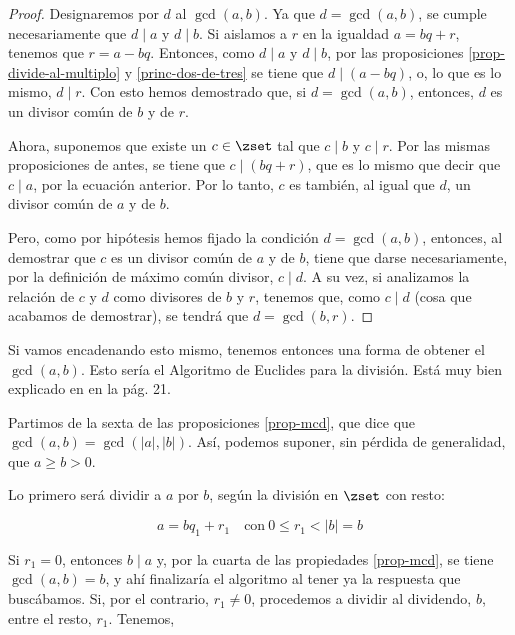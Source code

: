 \begin{proof}
  Designaremos por $d$ al $\gcd(a, b)$. Ya que $d = \gcd(a, b)$, se cumple
  necesariamente que $d \mid a$ y $d \mid b$. Si aislamos a $r$ en la
  igualdad $a = bq + r$, tenemos que $r = a - bq$. Entonces, como $d \mid a$
  y $d \mid b$, por las proposiciones \ref{prop-divide-al-multiplo} y
  \ref{princ-dos-de-tres} se tiene que $d \mid (a - bq)$, o, lo que es lo
  mismo, $d \mid r$. Con esto hemos demostrado que, si $d = \gcd(a, b)$,
  entonces, $d$ es un divisor común de $b$ y de $r$.

  Ahora, suponemos que existe un $c \in \zset$ tal que $c \mid b$ y $c \mid
  r$. Por las mismas proposiciones de antes, se tiene que $c \mid (bq + r)$,
  que es lo mismo que decir que $c \mid a$, por la ecuación anterior. Por lo
  tanto, $c$ es también, al igual que $d$, un divisor común de $a$ y de $b$.

  Pero, como por hipótesis hemos fijado la condición $d = \gcd(a, b)$,
  entonces, al demostrar que $c$ es un divisor común de $a$ y de $b$, tiene
  que darse necesariamente, por la definición de máximo común divisor, $c
  \mid d$. A su vez, si analizamos la relación de $c$ y $d$ como divisores
  de $b$ y $r$, tenemos que, como $c \mid d$ (cosa que acabamos de
  demostrar), se tendrá que $d = \gcd(b, r)$.
\end{proof}

\iffalse
Esta demostración está sacada de \cite{burton}, en la sección
2.4 \engm{The Euclidean Algorithm}, página 27. Aquí
\url{https://www.youtube.com/watch?v=rxL6nhYgI3E} hay otra demostración,
pero tiene un fallo y no sé si fiarme. Además, usa un teorema que no sé
demostrar. TKTK.
\fi

Si vamos encadenando esto mismo, tenemos entonces una forma de obtener el
$\gcd(a, b)$. Esto sería el Algoritmo de Euclides para la división. Está muy
bien explicado en \cite{texto-uned} en la pág. 21.

Partimos de la sexta de las proposiciones \ref{prop-mcd}, que dice que
$\gcd(a, b) = \gcd(|a|, |b|)$. Así, podemos suponer, sin pérdida de
generalidad, que $a \geq b > 0$.

Lo primero será dividir a $a$ por $b$, según la división en $\zset$ con
resto:

$$ a = bq_1 + r_1 \quad \text{con} \ 0 \leq r_1 < |b| = b $$

Si $r_1 = 0$, entonces $b \mid a$ y, por la cuarta de las propiedades
\ref{prop-mcd}, se tiene $\gcd(a, b) = b$, y ahí finalizaría el algoritmo al
tener ya la respuesta que buscábamos. Si, por el contrario, $r_1 \neq 0$,
procedemos a dividir al dividendo, $b$, entre el resto, $r_1$. Tenemos,

